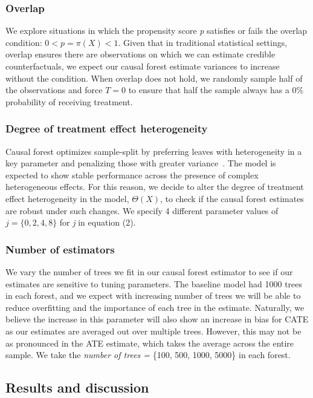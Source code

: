 \documentclass[12pt]{article}
\begin{document}
\subsubsection{Overlap}
We explore situations in which the propensity score \textit{p} satisfies or fails the overlap condition: $0 < p = \pi(X) < 1$. Given that in traditional statistical settings, overlap ensures there are observations on which we can estimate credible counterfactuals, we expect our causal forest estimate variances to increase without the condition. When overlap does not hold, we randomly sample half of the observations and force $T = 0$ to ensure that half the sample always has a 0\% probability of receiving treatment. 

\subsubsection{Degree of treatment effect heterogeneity} 
Causal forest optimizes sample-split by preferring leaves with heterogeneity in a key parameter and penalizing those with greater variance~\cite{athey2018grf}. The model is expected to show stable performance across the presence of complex heterogeneous effects. For this reason, we decide to alter the degree of treatment effect heterogeneity in the model, $\Theta(X)$, to check if the causal forest estimates are robust under such changes. We specify 4 different parameter values of $j = \{0,2,4,8\}$ for \textit{j} in equation (2). 

\subsubsection{Number of estimators} 
We vary the number of trees we fit in our causal forest estimator to see if our estimates are sensitive to tuning parameters. The baseline model had 1000 trees in each forest, and we expect with increasing number of trees we will be able to reduce overfitting and the importance of each tree in the estimate. Naturally, we believe the increase in this parameter will also show an increase in bias for CATE as our estimates are averaged out over multiple trees. However, this may not be as pronounced in the ATE estimate, which takes the average across the entire sample. We take the \textit{number of trees =} \{100, 500, 1000, 5000\} in each forest. 


\subsection{Results and discussion} 
\end{document}
